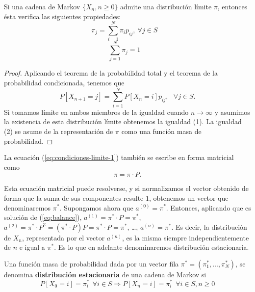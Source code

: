 \begin{proposicion}
    \label{prop:condiciones-limite}
    Si una cadena de Markov $\{X_n,n\geq 0\}$ admite una distribución límite $\pi$, entonces ésta verifica las siguientes propiedades:
    \begin{equation}
        \label{eq:condiciones-limite-1}
        \pi_j = \sum_{i=1}^N \pi_i p_{ij},\ \forall j\in S \ \ \ \ 
    \end{equation}
    \begin{equation}
        \label{eq:condiciones-limite-2}
        \sum_{j=1}^N \pi_j =1 \ \ \ \ 
    \end{equation}
    
\end{proposicion}
\begin{proof}
    Aplicando el teorema de la probabilidad total y el teorema de la probabilidad condicionada, tenemos que
    \begin{equation}
        \label{eq:prob-total-cond}
        P[X_{n+1}=j]=\sum_{i=1}^N P[X_n=i]p_{ij}, \ \ \ \forall j\in S.
    \end{equation}
    Si tomamos límite en ambos miembros de la igualdad cuando $n\rightarrow\infty$ y asumimos la existencia de esta distribución límite obtenemos la igualdad (1). La igualdad (2) se asume de la representación de $\pi$ como una función masa de probabilidad.
\end{proof}

La ecuación (\ref{eq:condiciones-limite-1}) también se escribe en forma matricial como 
\begin{equation}
    \label{eq:balance}
    \pi =\pi\cdot P.
\end{equation} 

Esta ecuación matricial puede resolverse, y si normalizamos el vector obtenido de forma que la suma de sus componentes resulte $1$, obtenemos un vector que denominaremos $\pi^*$. Supongamos ahora que $a^{(0)} = \pi^*$. Entonces, aplicando que es solución de (\ref{eq:balance}), $a^{(1)} = \pi^*\cdot P  = \pi^*$, $a^{(2)} = \pi^*\cdot P^2 = (\pi^* \cdot P) P = \pi^* \cdot P = \pi^*$, \dots, $a^{(n)}=\pi^*$. Es decir, la distribución de $X_n$, representada por el vector $a^{(n)}$, es la misma siempre independientemente de $n$ e igual a $\pi^*$. Es lo que en adelante denominaremos distribución estacionaria.

\begin{definicion}
    \label{def:estacionaria}
    Una función masa de probabilidad dada por un vector fila $\pi^* =(\pi_1^*,\dots,\pi_N^*)$, se denomina \textbf{distribución estacionaria} de una cadena de Markov si
    \begin{equation}
        P[X_0=i]=\pi_i^* \ \ \forall i\in S \Rightarrow P[X_n=i]=\pi_i^*\ \ \forall i\in S, n\geq 0
    \end{equation}
    
\end{definicion}

